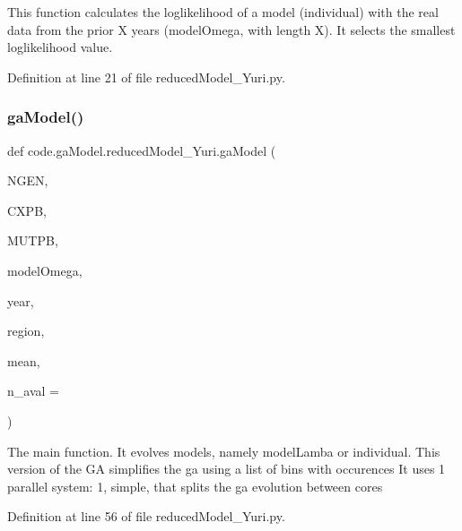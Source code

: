 \begin{DoxyVerb}This function calculates the loglikelihood of a model (individual) with 
the real data from the prior X years (modelOmega, with length X).
It selects the smallest loglikelihood value.
\end{DoxyVerb}
 

Definition at line 21 of file reduced\+Model\+\_\+\+Yuri.\+py.

\mbox{\label{namespacecode_1_1ga_model_1_1reduced_model___yuri_a8122076cc02bd20a75442fe3231de4b4}} 
\subsubsection{\texorpdfstring{ga\+Model()}{gaModel()}}
{\footnotesize\ttfamily def code.\+ga\+Model.\+reduced\+Model\+\_\+\+Yuri.\+ga\+Model (\begin{DoxyParamCaption}\item[{}]{N\+G\+EN,  }\item[{}]{C\+X\+PB,  }\item[{}]{M\+U\+T\+PB,  }\item[{}]{model\+Omega,  }\item[{}]{year,  }\item[{}]{region,  }\item[{}]{mean,  }\item[{}]{n\+\_\+aval = {} }\end{DoxyParamCaption})}

\begin{DoxyVerb}The main function. It evolves models, namely modelLamba or individual. 
This version of the GA simplifies the ga using a list of bins with occurences
It uses 1 parallel system: 1, simple, that splits the ga evolution between cores
\end{DoxyVerb}
 

Definition at line 56 of file reduced\+Model\+\_\+\+Yuri.\+py.

\mbox{\label{namespacecode_1_1ga_model_1_1reduced_model___yuri_a7c2776b17691500596d78ef2fa34cee9}} 
